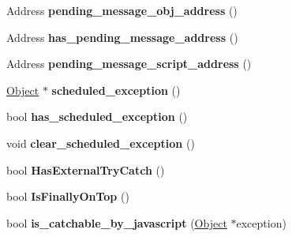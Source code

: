 \begin{DoxyCompactItemize}
\item 
\hypertarget{classv8_1_1internal_1_1_isolate_acbfb4b093ebe845fbf9eb1cc6c8eaa2e}{}Address {\bfseries pending\+\_\+message\+\_\+obj\+\_\+address} ()\label{classv8_1_1internal_1_1_isolate_acbfb4b093ebe845fbf9eb1cc6c8eaa2e}

\item 
\hypertarget{classv8_1_1internal_1_1_isolate_afa59843cb8765f9bfb3fac130b131204}{}Address {\bfseries has\+\_\+pending\+\_\+message\+\_\+address} ()\label{classv8_1_1internal_1_1_isolate_afa59843cb8765f9bfb3fac130b131204}

\item 
\hypertarget{classv8_1_1internal_1_1_isolate_ada3edde46e87f7ff1af7ed3d7abd0e6e}{}Address {\bfseries pending\+\_\+message\+\_\+script\+\_\+address} ()\label{classv8_1_1internal_1_1_isolate_ada3edde46e87f7ff1af7ed3d7abd0e6e}

\item 
\hypertarget{classv8_1_1internal_1_1_isolate_a29dbdaf15d5ab6522c07088916277b96}{}\hyperlink{classv8_1_1internal_1_1_object}{Object} $\ast$ {\bfseries scheduled\+\_\+exception} ()\label{classv8_1_1internal_1_1_isolate_a29dbdaf15d5ab6522c07088916277b96}

\item 
\hypertarget{classv8_1_1internal_1_1_isolate_a2601ee3df0f64de9b193648325c8e4ad}{}bool {\bfseries has\+\_\+scheduled\+\_\+exception} ()\label{classv8_1_1internal_1_1_isolate_a2601ee3df0f64de9b193648325c8e4ad}

\item 
\hypertarget{classv8_1_1internal_1_1_isolate_a1c210166a5d95dfb03d726684464bcb9}{}void {\bfseries clear\+\_\+scheduled\+\_\+exception} ()\label{classv8_1_1internal_1_1_isolate_a1c210166a5d95dfb03d726684464bcb9}

\item 
\hypertarget{classv8_1_1internal_1_1_isolate_aacf5e02aaba50b555aa658028365525b}{}bool {\bfseries Has\+External\+Try\+Catch} ()\label{classv8_1_1internal_1_1_isolate_aacf5e02aaba50b555aa658028365525b}

\item 
\hypertarget{classv8_1_1internal_1_1_isolate_a148e03b5b445a84ea8ccb1c9b1516460}{}bool {\bfseries Is\+Finally\+On\+Top} ()\label{classv8_1_1internal_1_1_isolate_a148e03b5b445a84ea8ccb1c9b1516460}

\item 
\hypertarget{classv8_1_1internal_1_1_isolate_a327acb0c7a2c9390eef6abc374a6aa05}{}bool {\bfseries is\+\_\+catchable\+\_\+by\+\_\+javascript} (\hyperlink{classv8_1_1internal_1_1_object}{Object} $\ast$exception)\label{classv8_1_1internal_1_1_isolate_a327acb0c7a2c9390eef6abc374a6aa05}


\end{DoxyCompactItemize}
